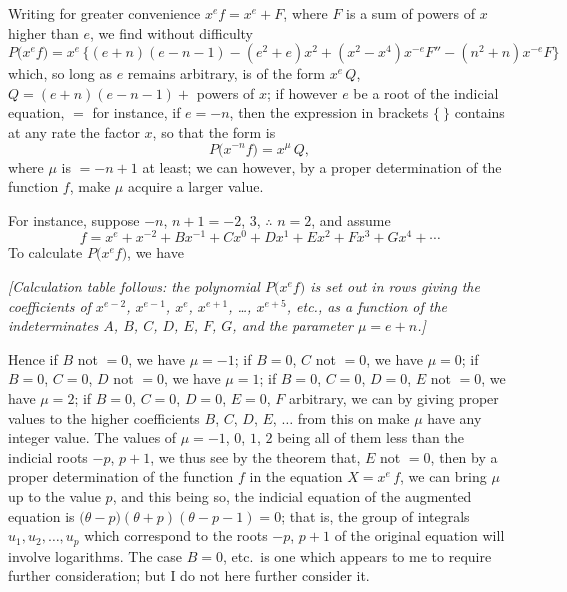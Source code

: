 \documentclass[11pt]{article}
\begin{document}
Writing for greater convenience $x^{e}f = x^{e} + F$, where $F$ is a sum of powers of $x$ higher than $e$, we find without difficulty
\[
P\bigl(x^{e}f\bigr) = x^{e}\,\bigl\{(e+n)(e-n-1) - (e^{2}+e)x^{2}
  + (x^{2}-x^{4})x^{-e}F'' - (n^{2}+n)x^{-e}F\bigr\}
\]
which, so long as $e$ remains arbitrary, is of the form $x^{e}\,Q$, $Q = (e + n)(e - n - 1) + $ powers of $x$; if however $e$ be a root of the indicial equation, $=$ for instance, if $e = -n$, then the expression in brackets $\{\ \}$ contains at any rate the factor $x$, so that the form is
\[
P\bigl(x^{-n}f\bigr) = x^{\mu}\,Q,
\]
where $\mu$ is $= -n + 1$ at least; we can however, by a proper determination of the function $f$, make $\mu$ acquire a larger value.

For instance, suppose $-n$, $n + 1 = -2$, $3$, $\therefore$ $n = 2$, and assume
\[
f = x^{e} + x^{-2} + Bx^{-1} + Cx^{0} + Dx^{1} + Ex^{2} + Fx^{3} + Gx^{4} + \cdots
\]
To calculate $P\bigl(x^{e}f\bigr)$, we have

\medskip

\textit{[Calculation table follows: the polynomial $P\bigl(x^{e}f\bigr)$ is set out in rows giving the coefficients of $x^{e-2}$, $x^{e-1}$, $x^{e}$, $x^{e+1}$, \ldots, $x^{e+5}$, etc., as a function of the indeterminates $A$, $B$, $C$, $D$, $E$, $F$, $G$, and the parameter $\mu = e + n$.]}

\medskip

\noindent Hence if $B$ not $=0$, we have $\mu = -1$; if $B = 0$, $C$ not $=0$, we have $\mu = 0$; if $B = 0$, $C = 0$, $D$ not $=0$, we have $\mu = 1$; if $B = 0$, $C = 0$, $D = 0$, $E$ not $=0$, we have $\mu = 2$; if $B = 0$, $C = 0$, $D = 0$, $E = 0$, $F$ arbitrary, we can by giving proper values to the higher coefficients $B$, $C$, $D$, $E$, $\ldots$ from this on make $\mu$ have any integer value. The values of $\mu = -1$, $0$, $1$, $2$ being all of them less than the indicial roots $-p$, $p + 1$, we thus see by the theorem that, $E$ not $=0$, then by a proper determination of the function $f$ in the equation $X = x^{e}\,f$, we can bring $\mu$ up to the value $p$, and this being so, the indicial equation of the augmented equation is $\bigl(\theta - p\bigr)(\theta + p)(\theta - p - 1) = 0$; that is, the group of integrals $u_{1}, u_{2}, \ldots, u_{p}$ which correspond to the roots $-p$, $p + 1$ of the original equation will involve logarithms. The case $B = 0$, etc.\ is one which appears to me to require further consideration; but I do not here further consider it.

\vfill
\end{document}
